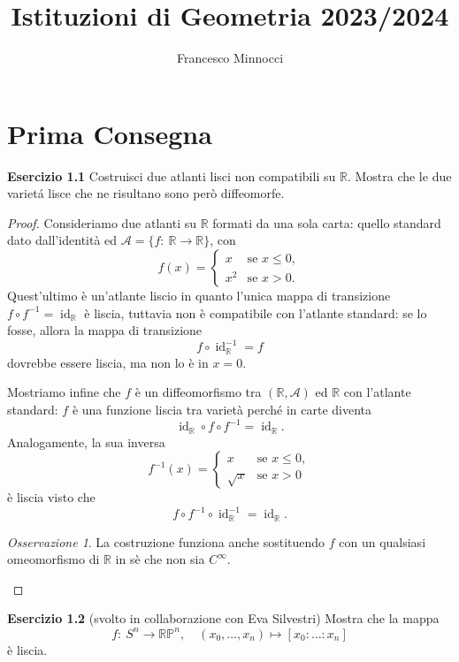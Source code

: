 \documentclass[a4paper]{article}
\title{Istituzioni di Geometria 2023/2024}
\author{Francesco Minnocci}
\newcommand{\R}{\mathbb{R}}
\renewcommand{\P}{\mathbb{P}}
\newcommand{\id}{\operatorname{id}}
\theoremstyle{definition}
\theoremstyle{definition}
\theoremstyle{remark}
\newtheorem*{remark}{Osservazione}
\theoremstyle{definition}
\begin{document}
\maketitle
\section*{Prima Consegna}
\textbf{Esercizio 1.1}
Costruisci due atlanti lisci non compatibili su $\R$. Mostra che le due varietá lisce che ne risultano sono però diffeomorfe.
\begin{proof}
    Consideriamo due atlanti su $\R$ formati da una sola carta: quello standard dato dall'identità ed $\mathcal{A} = \{ f:\: \R\to\R \}$, con
    \[
        f(x) = \begin{cases}
            x   & \text{se } x \leq 0, \\
            x^2 & \text{se } x > 0.
        \end{cases}
    \]
    Quest'ultimo è un'atlante liscio in quanto l'unica mappa di transizione $f \circ f ^{-1} =  \id_{\R}$ è liscia, tuttavia non è compatibile con l'atlante standard: se
    lo fosse, allora la mappa di transizione
    \[
        f \circ \id_{\R}^{-1} = f
    \]
    dovrebbe essere liscia, ma non lo è in $x = 0$.

    Mostriamo infine che $f$ è un diffeomorfismo tra $(\R, \mathcal{A})$ ed $\R$ con l'atlante standard: $f$ è una funzione liscia tra varietà perché in carte diventa
    \[
        \id_{\R} \circ f \circ f^{-1} = \id_{\R}
        .\]
    Analogamente, la sua inversa
    \[
        f^{-1}(x) = \begin{cases}
            x        & \text{se } x \leq 0, \\
            \sqrt{x} & \text{se } x > 0
        \end{cases}
    \]
    è liscia visto che \[
        f \circ f^{-1} \circ \id_{\R}^{-1} = \id_{\R}.
    \]
    \begin{remark}
        La costruzione funziona anche sostituendo $f$ con un qualsiasi omeomorfismo di $\R$ in sè che non sia $C^\infty$.
    \end{remark}
\end{proof}
\textbf{Esercizio 1.2} (svolto in collaborazione con Eva Silvestri)
Mostra che la mappa
\[
    f:\:S^n \to \R\P^n, \quad (x_0, \ldots, x_n) \mapsto [x_0 : \ldots : x_n]
\]
è liscia.
\end{document}
